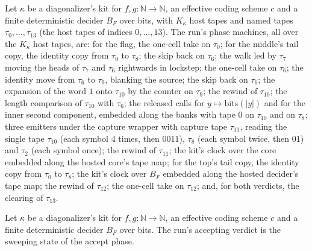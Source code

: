 \begin{definition}
\label{Turing.NTimeDiag.dzQM}
\leanok
{}
Let $\kappa$ be a diagonalizer's kit for $f, g : \mathbb{N} \to \mathbb{N}$, an effective coding scheme $c$ and a finite deterministic decider $B_F$ over bits, with $K_\kappa$ host tapes and named tapes $\tau_0, \dots, \tau_{13}$ (the host tapes of indices $0, \dots, 13$). The run's phase machines, all over the $K_\kappa$ host tapes, are: for the flag, the one-cell take on $\tau_0$; for the middle's tail copy, the identity copy from $\tau_0$ to $\tau_8$; the skip back on $\tau_6$; the walk led by $\tau_7$ moving the heads of $\tau_7$ and $\tau_6$ rightwards in lockstep; the one-cell take on $\tau_6$; the identity move from $\tau_6$ to $\tau_9$, blanking the source; the skip back on $\tau_6$; the expansion of the word $1$ onto $\tau_{10}$ by the counter on $\tau_9$; the rewind of $\tau_{10}$; the length comparison of $\tau_{10}$ with $\tau_6$; the released calls for $y \mapsto \mathrm{bits}(|y|)$ and for the inner second component, embedded along the banks with tape $0$ on $\tau_{10}$ and on $\tau_8$; three emitters under the capture wrapper with capture tape $\tau_{11}$, reading the single tape $\tau_{10}$ (each symbol $4$ times, then $0011$), $\tau_8$ (each symbol twice, then $01$) and $\tau_2$ (each symbol once); the rewind of $\tau_{11}$; the kit's clock over the core embedded along the hosted core's tape map; for the top's tail copy, the identity copy from $\tau_0$ to $\tau_8$; the kit's clock over $B_F$ embedded along the hosted decider's tape map; the rewind of $\tau_{12}$; the one-cell take on $\tau_{12}$; and, for both verdicts, the clearing of $\tau_{13}$.
\end{definition}

\begin{definition}
\label{Turing.NTimeDiag.dzAcc}
\leanok
{}
Let $\kappa$ be a diagonalizer's kit for $f, g : \mathbb{N} \to \mathbb{N}$, an effective coding scheme $c$ and a finite deterministic decider $B_F$ over bits. The run's accepting verdict is the sweeping state of the accept phase.
\end{definition}

